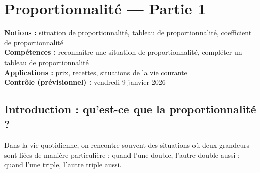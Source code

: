 \chapter{Proportionnalité — Partie 1}
\label{chap:seq06-proportionnalite-1}

\seance

\begin{objectifsbox}
	\textbf{Notions :} situation de proportionnalité, tableau de proportionnalité, coefficient de proportionnalité\\
	\textbf{Compétences :} reconnaître une situation de proportionnalité, compléter un tableau de proportionnalité\\
	\textbf{Applications :} prix, recettes, situations de la vie courante\\
	\textbf{Contrôle (prévisionnel) :} vendredi 9 janvier 2026
\end{objectifsbox}

\section{Introduction : qu'est-ce que la proportionnalité ?}

Dans la vie quotidienne, on rencontre souvent des situations où deux grandeurs sont liées de manière particulière : quand l'une double, l'autre double aussi ; quand l'une triple, l'autre triple aussi.

